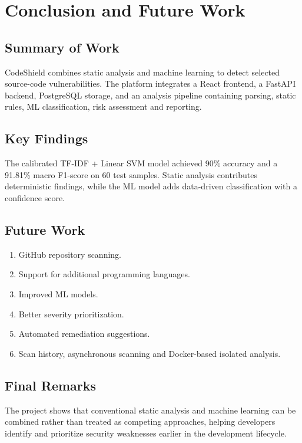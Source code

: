 \documentclass[12pt,a4paper]{report}
\begin{document}
\chapter{Conclusion and Future Work}

\section{Summary of Work}
CodeShield combines static analysis and machine learning to detect selected source-code vulnerabilities. The platform integrates a React frontend, a FastAPI backend, PostgreSQL storage, and an analysis pipeline containing parsing, static rules, ML classification, risk assessment and reporting.

\section{Key Findings}
The calibrated TF-IDF + Linear SVM model achieved 90\% accuracy and a 91.81\% macro F1-score on 60 test samples. Static analysis contributes deterministic findings, while the ML model adds data-driven classification with a confidence score.

\section{Future Work}
\begin{enumerate}[noitemsep]
  \item GitHub repository scanning.
  \item Support for additional programming languages.
  \item Improved ML models.
  \item Better severity prioritization.
  \item Automated remediation suggestions.
  \item Scan history, asynchronous scanning and Docker-based isolated analysis.
\end{enumerate}

\section{Final Remarks}
The project shows that conventional static analysis and machine learning can be combined rather than treated as competing approaches, helping developers identify and prioritize security weaknesses earlier in the development lifecycle.
\end{document}
